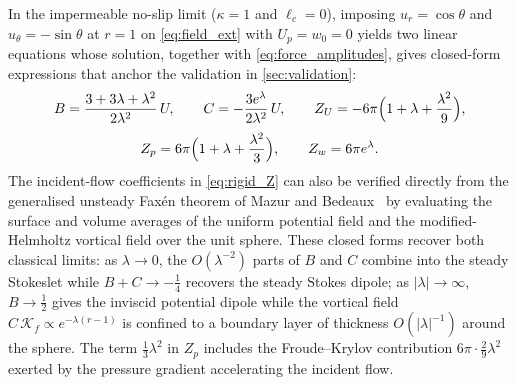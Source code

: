 In the impermeable no-slip limit ($\kappa=1$ and $\hat\ell_c=0$), imposing $u_r=\cos\theta$ and $u_\theta=-\sin\theta$ at
$r=1$ on \cref{eq:field_ext} with $U_p=w_0=0$ yields two linear equations whose solution, together with
\cref{eq:force_amplitudes}, gives closed-form expressions that anchor the validation in \cref{sec:validation}:
\begin{equation}
  B=\frac{3+3\lambda+\lambda^2}{2\lambda^2}\,U,\qquad C=-\frac{3e^{\lambda}}{2\lambda^2}\,U,\qquad
  Z_U=-6\pi\Bigl(1+\lambda+\frac{\lambda^2}{9}\Bigr),
  \label{eq:rigid_BC}
\end{equation}
\begin{equation}
  Z_p=6\pi\Bigl(1+\lambda+\frac{\lambda^2}{3}\Bigr),\qquad Z_w=6\pi e^{\lambda}.
  \label{eq:rigid_Z}
\end{equation}
The incident-flow coefficients in \cref{eq:rigid_Z} can also be verified directly from the generalised unsteady Faxén
theorem of Mazur and Bedeaux~\cite{mazur1974generalization} by evaluating the surface and volume averages of the uniform
potential field and the modified-Helmholtz vortical field over the unit sphere. These closed forms recover both classical
limits: as $\lambda\to0$, the $O(\lambda^{-2})$ parts of $B$ and $C$ combine into the steady Stokeslet while
$B+C\to-\tfrac14$ recovers the steady Stokes dipole; as $|\lambda|\to\infty$, $B\to\tfrac12$ gives the inviscid potential
dipole while the vortical field $C\,\mathcal K_f\propto e^{-\lambda(r-1)}$ is confined to a boundary layer of thickness
$O(|\lambda|^{-1})$ around the sphere. The term $\tfrac13\lambda^2$ in $Z_p$ includes the Froude--Krylov contribution
$6\pi\cdot\tfrac29\lambda^2$ exerted by the pressure gradient accelerating the incident flow.

